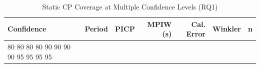 \begin{table}
\caption{Static CP Coverage at Multiple Confidence Levels (RQ1)}
\label{tab:t4_2_multi_confidence}
\begin{tabular}{llrrrrr}
\toprule
Confidence & Period & PICP & MPIW (s) & Cal. Error & Winkler & n \\
\midrule
80%
80%
80%
80%
90%
90%
90%
90%
95%
95%
95%
95%
\bottomrule
\end{tabular}
\end{table}
